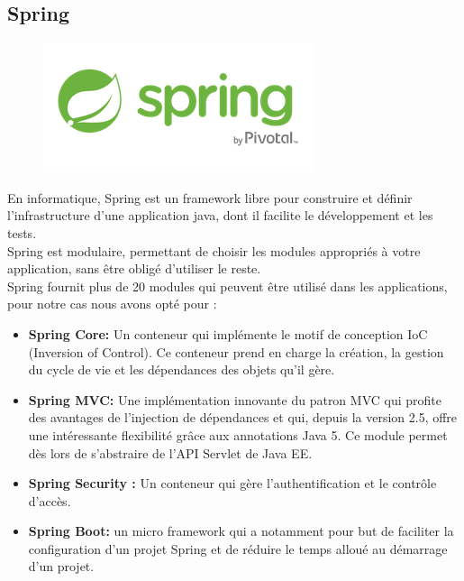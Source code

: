 \documentclass[12pt,a4paper]{report}
\begin{document}
		\subsection{Spring}
		\begin{figure}
		\includegraphics[scale=0.25]{./graphics/spring.png}
		\end{figure}
		En informatique, Spring est un framework libre pour construire et définir l'infrastructure d'une application java, dont il facilite le développement et les tests.\\
Spring est modulaire, permettant de choisir les modules appropriés à votre application, sans être obligé d'utiliser le reste.\\
Spring fournit plus de 20 modules qui peuvent être utilisé dans les applications, pour notre cas nous avons opté pour : \\
		\begin{itemize}
				\item \textbf{Spring Core:} Un conteneur qui implémente le motif de conception IoC (Inversion of Control). Ce conteneur prend en charge la création, la gestion du cycle de vie et les dépendances des objets qu'il gère.
				\item \textbf{Spring MVC:} Une implémentation innovante du patron MVC qui profite des avantages de l’injection de dépendances et qui, depuis la version 2.5, offre une intéressante flexibilité grâce aux annotations
Java 5. Ce module permet dès lors de s’abstraire de l’API Servlet de Java EE.
				\item \textbf{Spring Security :} Un conteneur qui gère l'authentification et le contrôle d'accès.
				\item \textbf{Spring Boot:} un micro framework qui a notamment pour but de faciliter la configuration d'un projet Spring et de réduire le temps alloué au démarrage d'un projet.	
				\end{itemize}
		
\end{document}
